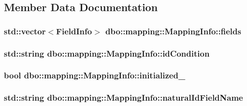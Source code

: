 \subsection{Member Data Documentation}
\hypertarget{classdbo_1_1mapping_1_1_mapping_info_a07655a3c9ed3ada83735b7ab85775dec}{
\subsubsection[{fields}]{\setlength{\rightskip}{0pt plus 5cm}std\+::vector$<${\bf Field\+Info}$>$ dbo\+::mapping\+::\+Mapping\+Info\+::fields}}\label{classdbo_1_1mapping_1_1_mapping_info_a07655a3c9ed3ada83735b7ab85775dec}
\hypertarget{classdbo_1_1mapping_1_1_mapping_info_a1b0c501e1c8b77b950da36250119fb43}{
\subsubsection[{id\+Condition}]{\setlength{\rightskip}{0pt plus 5cm}std\+::string dbo\+::mapping\+::\+Mapping\+Info\+::id\+Condition}}\label{classdbo_1_1mapping_1_1_mapping_info_a1b0c501e1c8b77b950da36250119fb43}
\hypertarget{classdbo_1_1mapping_1_1_mapping_info_acb52011c465986c42a13d51143810669}{
\subsubsection[{initialized\+\_\+}]{\setlength{\rightskip}{0pt plus 5cm}bool dbo\+::mapping\+::\+Mapping\+Info\+::initialized\+\_\+}}\label{classdbo_1_1mapping_1_1_mapping_info_acb52011c465986c42a13d51143810669}
\hypertarget{classdbo_1_1mapping_1_1_mapping_info_af25df5f23a08b2cd0df50e70e1f8153b}{
\subsubsection[{natural\+Id\+Field\+Name}]{\setlength{\rightskip}{0pt plus 5cm}std\+::string dbo\+::mapping\+::\+Mapping\+Info\+::natural\+Id\+Field\+Name}}\label{classdbo_1_1mapping_1_1_mapping_info_af25df5f23a08b2cd0df50e70e1f8153b}
